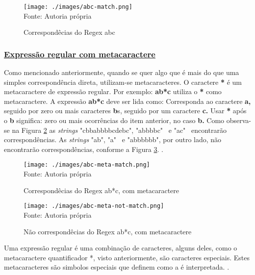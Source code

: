\begin{figure}[H]
    \centering
    \caption{Correspondêcias do Regex abc}
    \texttt{[image: ./images/abc-match.png]}
    \label{fig:abc-match} \\
    \textnormal{\fontsize{10pt}{12pt}Fonte: Autoria própria}
\end{figure}

\subsubsection{\underline{Expressão regular com metacaractere}}

Como mencionado anteriormente, quando se quer algo que é mais do
que uma simples correspondência direta, utilizam-se metacaracteres.
O caractere
\textbf{*}
é um metacaractere de expressão regular. Por exemplo:
\textbf{ab*c}
utiliza o
\textbf{*}
como metacaractere. A expressão
\textbf{ab*c}
deve ser lida como: Corresponda ao caractere
\textbf{a,}
seguido por zero ou mais caracteres
\textbf{b}s,
seguido por um caractere
\textbf{c.}
Usar
\textbf{*}
após o
\textbf{b}
significa: zero ou mais ocorrências do item anterior, no caso
\textbf{b.}
Como observa-se na
Figura \ref{fig:abc-meta-match}
as \textit{strings} "cbbabbbbcdebc", "abbbbc"~ e "ac"~
encontrarão correspondências. As \textit{strings} "ab", "a"~ e "abbbbbb", por
outro lado, não encontrarão correspondências, conforme a
Figura \ref{fig:abc-meta-not-match}.
\cite{mdn-regex}.

\begin{figure}[H]
    \centering
    \caption{Correspondêcias do Regex ab*c, com metacaractere}
    \texttt{[image: ./images/abc-meta-match.png]}
    \label{fig:abc-meta-match} \\
    \textnormal{\fontsize{10pt}{12pt}Fonte: Autoria própria}
\end{figure}

\begin{figure}[H]
    \centering
    \caption{Não correspondêcias do Regex ab*c, com metacaractere}
    \texttt{[image: ./images/abc-meta-not-match.png]}
    \label{fig:abc-meta-not-match} \\
    \textnormal{\fontsize{10pt}{12pt}Fonte: Autoria própria}
\end{figure}

Uma expressão regular é uma combinação de caracteres, alguns
deles, como o metacaractere quantificador *, visto
anteriormente, são caracteres especiais. Estes metacaracteres
são simbolos especiais que definem como a é interpretada.
\cite{dp6-regex}.

